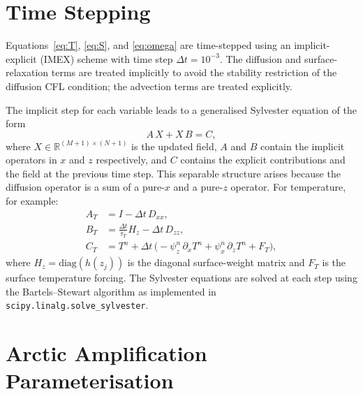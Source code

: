 \documentclass[12pt, a4paper]{article}
\begin{document}
\section{Time Stepping}
\label{sec:timestepping}

Equations~\eqref{eq:T}, \eqref{eq:S}, and \eqref{eq:omega} are time-stepped
using an implicit-explicit (IMEX) scheme with time step $\Delta t = 10^{-3}$.
The diffusion and surface-relaxation terms are treated implicitly to avoid the
stability restriction of the diffusion CFL condition; the advection terms are
treated explicitly.

The implicit step for each variable leads to a generalised Sylvester equation
of the form
\begin{equation}
  A\,X + X\,B = C,
\end{equation}
where $X \in \mathbb{R}^{(M+1)\times(N+1)}$ is the updated field, $A$ and $B$
contain the implicit operators in $x$ and $z$ respectively, and $C$ contains
the explicit contributions and the field at the previous time step. This
separable structure arises because the diffusion operator is a sum of a
pure-$x$ and a pure-$z$ operator. For temperature, for example:
\begin{align}
  A_T &= I - \Delta t\,D_{xx}, \\
  B_T &= \frac{\Delta t}{\tau_T}H_z - \Delta t\,D_{zz},\\
  C_T &= T^n + \Delta t\,\bigl(-\psi^n_z\,\partial_x T^n
         + \psi^n_x\,\partial_z T^n + F_T\bigr),
\end{align}
where $H_z = \mathrm{diag}(h(z_j))$ is the diagonal surface-weight matrix
and $F_T$ is the surface temperature forcing. The Sylvester equations are
solved at each step using the Bartels--Stewart algorithm as implemented in
\texttt{scipy.linalg.solve\_sylvester}.

\section{Arctic Amplification Parameterisation}
\label{sec:gamma}
\end{document}

